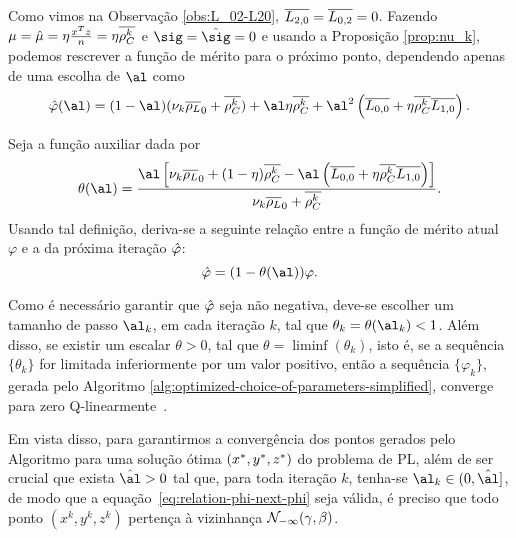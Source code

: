 Como vimos na Observação \ref{obs:L_02-L20},  $\overline{L_{2,0}} = \overline{L_{0,2}} = 0$. Fazendo $\mu = \hat{\mu} = \eta\frac{x^Tz}{n} = \eta\overline{\rho_C^k } $
 e $\sig = \nextsig=0$ e usando a Proposição \ref{prop:nu_k},   podemos rescrever a função de mérito para o próximo ponto, dependendo apenas de uma escolha de  $\al$ como
\begin{equation}
	\label{eq:simplified-merit-function-al}
\nextphi(\al)  = (1-\al)(\nu_k\dbvec{\rho_L}_0 +
\dbvec{\rho_C^k }) + \al\eta\dbvec{\rho_C^k } + \al^2\left(\dbvec{L_{0,0}} + \eta\dbvec{\rho_C^k } \dbvec{L_{1,0}}
\right) .
\end{equation}

Seja a função auxiliar  dada por
\begin{equation}
	\label{eq:theta}
\theta(\al) =  \dfrac{\al\left[ \nu_k\dbvec{\rho_L}_0 + (1-\eta)\dbvec{\rho_C^k } - \al\left(\dbvec{L_{0,0}} + \eta\dbvec{\rho_C^k } \dbvec{L_{1,0}}
\right) \right]}{\nu_k\dbvec{\rho_L}_0 +
\dbvec{\rho_C^k }}.
\end{equation}
Usando tal definição, deriva-se a seguinte relação entre a função de mérito atual  $\varphi$  e a da próxima iteração  $\hat{\varphi}$: 
\begin{equation}
	\label{eq:relation-phi-next-phi}
	 			{\nextphi} = (1- \theta(\al))\varphi.
\end{equation}


Como é necessário garantir que  $\hat{\varphi}  $  seja não negativa, deve-se escolher um tamanho de passo  $\al_k$, em cada iteração $k$, tal que  $\theta_k = \theta(\al_k)<1$. Além disso, se existir um escalar $\theta>0$, tal que $\theta = \liminf (\theta_k)$, isto é, se a sequência $\{\theta_k\}$ for limitada inferiormente por um valor positivo,	 então a sequência $\{\varphi_k\}$, gerada pelo Algoritmo \ref{alg:optimized-choice-of-parameters-simplified}, converge para zero Q-linearmente~\cite{Ortega:2000vd}.




 Em vista disso, para garantirmos a convergência dos pontos gerados pelo Algoritmo para uma solução ótima $(x^*,y^*,z^*)$ do problema de \ac{PL}, além de ser  crucial que exista $\hat{\al}>0$  tal que,  para toda iteração $k$, tenha-se  $\al_k\in(0,\hat{\al}]$, de modo que a equação~\eqref{eq:relation-phi-next-phi} seja válida, é preciso que todo   ponto  $({x}^{k} ,{y}^{k},{z}^{k})$ pertença à vizinhança $\mathcal{N}_{-\infty}(\gamma,\beta)$.

